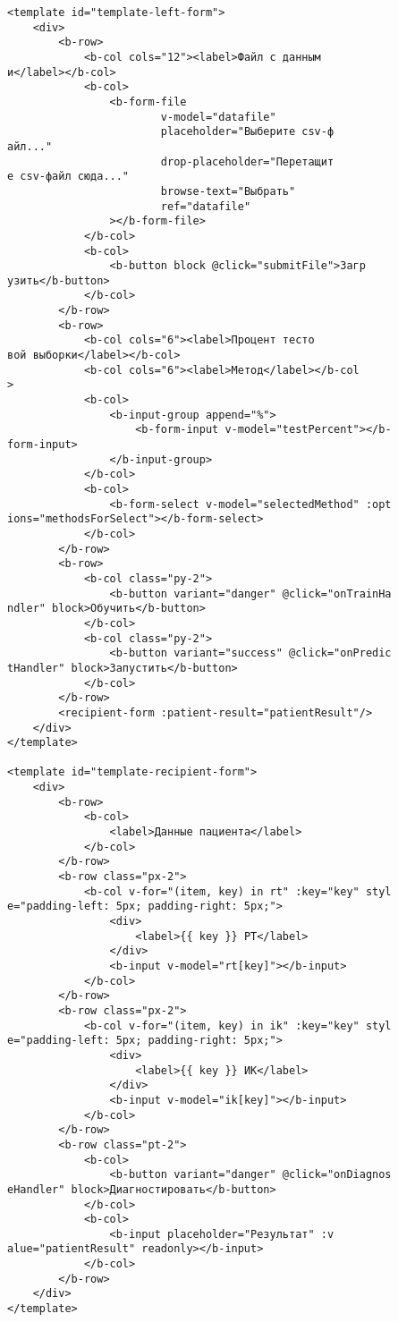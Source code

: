 \begin{verbatim}
<template id="template-left-form">
    <div>
        <b-row>
            <b-col cols="12"><label>Файл с данным
и</label></b-col>
            <b-col>
                <b-form-file
                        v-model="datafile"
                        placeholder="Выберите csv-ф
айл..."
                        drop-placeholder="Перетащит
е csv-файл сюда..."
                        browse-text="Выбрать"
                        ref="datafile"
                ></b-form-file>
            </b-col>
            <b-col>
                <b-button block @click="submitFile">Загр
узить</b-button>
            </b-col>
        </b-row>
        <b-row>
            <b-col cols="6"><label>Процент тесто
вой выборки</label></b-col>
            <b-col cols="6"><label>Метод</label></b-col
>
            <b-col>
                <b-input-group append="%">
                    <b-form-input v-model="testPercent"></b-
form-input>
                </b-input-group>
            </b-col>
            <b-col>
                <b-form-select v-model="selectedMethod" :opt
ions="methodsForSelect"></b-form-select>
            </b-col>
        </b-row>
        <b-row>
            <b-col class="py-2">
                <b-button variant="danger" @click="onTrainHa
ndler" block>Обучить</b-button>
            </b-col>
            <b-col class="py-2">
                <b-button variant="success" @click="onPredic
tHandler" block>Запустить</b-button>
            </b-col>
        </b-row>
        <recipient-form :patient-result="patientResult"/>
    </div>
</template>

<template id="template-recipient-form">
    <div>
        <b-row>
            <b-col>
                <label>Данные пациента</label>
            </b-col>
        </b-row>
        <b-row class="px-2">
            <b-col v-for="(item, key) in rt" :key="key" styl
e="padding-left: 5px; padding-right: 5px;">
                <div>
                    <label>{{ key }} РТ</label>
                </div>
                <b-input v-model="rt[key]"></b-input>
            </b-col>
        </b-row>
        <b-row class="px-2">
            <b-col v-for="(item, key) in ik" :key="key" styl
e="padding-left: 5px; padding-right: 5px;">
                <div>
                    <label>{{ key }} ИК</label>
                </div>
                <b-input v-model="ik[key]"></b-input>
            </b-col>
        </b-row>
        <b-row class="pt-2">
            <b-col>
                <b-button variant="danger" @click="onDiagnos
eHandler" block>Диагностировать</b-button>
            </b-col>
            <b-col>
                <b-input placeholder="Результат" :v
alue="patientResult" readonly></b-input>
            </b-col>
        </b-row>
    </div>
</template>


\end{verbatim}
